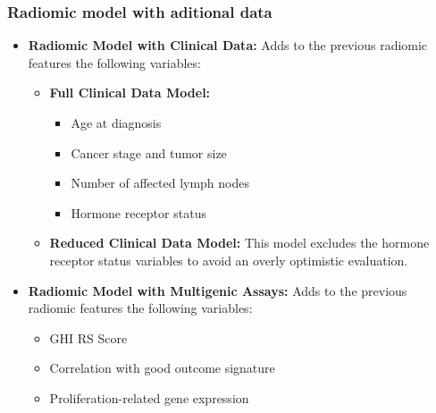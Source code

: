 \begin{frame}
    \frametitle{Radiomic model with aditional data}
    \vspace{3mm}
	
    \begin{itemize}
        \item \textbf{Radiomic Model with Clinical Data:}  
        Adds to the previous radiomic features the following variables:

	\vspace{2mm}

        \begin{itemize}
            \item \textbf{Full Clinical Data Model:}
            \begin{itemize}
                \item Age at diagnosis
                \item Cancer stage and tumor size
                \item Number of affected lymph nodes
                \item Hormone receptor status
            \end{itemize}
            \item \textbf{Reduced Clinical Data Model:}  
            This model excludes the hormone receptor status variables to avoid an overly optimistic evaluation.
        \end{itemize}

        \vspace{3mm}

        \item \textbf{Radiomic Model with Multigenic Assays:}  
        Adds to the previous radiomic features the following variables:
        \begin{itemize}
            \item GHI RS Score
            \item Correlation with good outcome signature
            \item Proliferation-related gene expression
        \end{itemize}
    \end{itemize}

    \vfill
\end{frame}